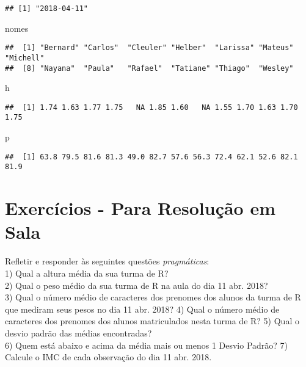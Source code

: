\documentclass[]{article}
\newenvironment{Shaded}{\begin{snugshade}}{\end{snugshade}}
\newcommand{\NormalTok}[1]{#1}
\begin{document}
\begin{verbatim}
## [1] "2018-04-11"
\end{verbatim}

\begin{Shaded}
\begin{Highlighting}[]
\NormalTok{nomes}
\end{Highlighting}
\end{Shaded}

\begin{verbatim}
##  [1] "Bernard" "Carlos"  "Cleuler" "Helber"  "Larissa" "Mateus"  "Michell"
##  [8] "Nayana"  "Paula"   "Rafael"  "Tatiane" "Thiago"  "Wesley"
\end{verbatim}

\begin{Shaded}
\begin{Highlighting}[]
\NormalTok{h}
\end{Highlighting}
\end{Shaded}

\begin{verbatim}
##  [1] 1.74 1.63 1.77 1.75   NA 1.85 1.60   NA 1.55 1.70 1.63 1.70 1.75
\end{verbatim}

\begin{Shaded}
\begin{Highlighting}[]
\NormalTok{p}
\end{Highlighting}
\end{Shaded}

\begin{verbatim}
##  [1] 63.8 79.5 81.6 81.3 49.0 82.7 57.6 56.3 72.4 62.1 52.6 82.1 81.9
\end{verbatim}

\section{Exercícios - Para Resolução em
Sala}\label{exercicios---para-resolucao-em-sala}

Refletir e responder às seguintes questões \emph{pragmáticas}:\\
1) Qual a altura média da sua turma de R?\\
2) Qual o peso médio da sua turma de R na aula do dia 11 abr. 2018?\\
3) Qual o número médio de caracteres dos prenomes dos alunos da turma de
R que mediram seus pesos no dia 11 abr. 2018? 4) Qual o número médio de
caracteres dos prenomes dos alunos matriculados nesta turma de R? 5)
Qual o desvio padrão das médias encontradas?\\
6) Quem está abaixo e acima da média mais ou menos 1 Desvio Padrão? 7)
Calcule o IMC de cada observação do dia 11 abr. 2018.
\end{document}
